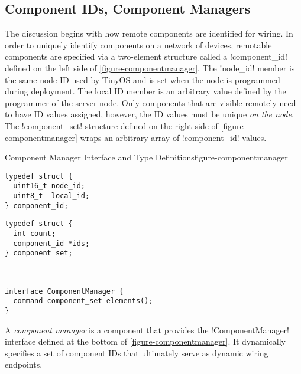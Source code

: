 \subsection{Component IDs, Component Managers}
\label{section-componentmanager}

The discussion begins with how remote components are identified for wiring. In order to uniquely
identify components on a network of devices, remotable components are specified via a
two-element structure called a !component_id! defined on the left side of
\autoref{figure-componentmanager}. The !node_id! member is the same node ID used by TinyOS and
is set when the node is programmed during deployment. The local ID member is an arbitrary value
defined by the programmer of the server node. Only components that are visible remotely need to
have ID values assigned, however, the ID values must be unique \emph{on the node}. The
!component_set! structure defined on the right side of \autoref{figure-componentmanager} wraps
an arbitrary array of !component_id! values.
 
\begin{fpfig}[t]{Component Manager Interface and Type Definitions}{figure-componentmanager}
{
\begin{minipage}[t]{2.5in}
\singlespace
\begin{lstlisting}
typedef struct {
  uint16_t node_id;
  uint8_t  local_id;
} component_id;
\end{lstlisting}
\primaryspacing
\end{minipage}
\hfill
\begin{minipage}[t]{2.5in}
\singlespace
\begin{lstlisting}
typedef struct {
  int count;
  component_id *ids;
} component_set;
\end{lstlisting}
\primaryspacing
\end{minipage}
\\
\centering
\begin{minipage}[t]{5in}
\vspace{1.5em}
\singlespace
\begin{lstlisting}
interface ComponentManager {
  command component_set elements();
}
\end{lstlisting}
\primaryspacing
\end{minipage}
}
\end{fpfig}

A \emph{component manager} is a component that provides the !ComponentManager! interface defined
at the bottom of \autoref{figure-componentmanager}. It dynamically specifies a set of component
IDs that ultimately serve as dynamic wiring endpoints.

